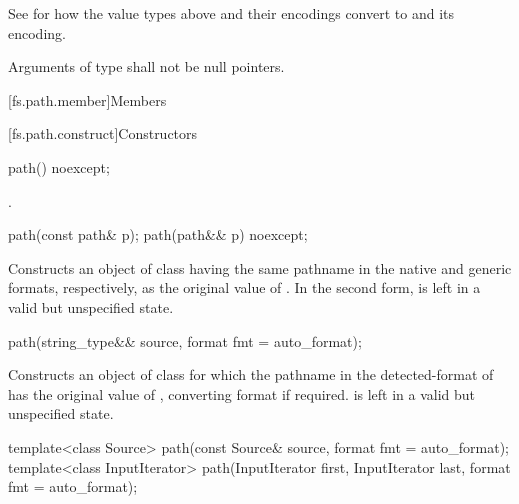 \pnum
\begin{note}
See 
for how the value types above and their encodings convert to
 and its encoding.
\end{note}

\pnum
Arguments of type 
shall not be null pointers.

[fs.path.member]{Members}

[fs.path.construct]{Constructors}

%
\begin{itemdecl}
path() noexcept;
\end{itemdecl}

\begin{itemdescr}
\pnum
\ensures
{}.
\end{itemdescr}

%
\begin{itemdecl}
path(const path& p);
path(path&& p) noexcept;
\end{itemdecl}

\begin{itemdescr}
\pnum
\effects
Constructs an object of class 
having the same pathname in the native and generic formats, respectively,
as the original value of .
In the second form,  is left in a valid but unspecified state.
\end{itemdescr}

%
\begin{itemdecl}
path(string_type&& source, format fmt = auto_format);
\end{itemdecl}

\begin{itemdescr}
\pnum
\effects
Constructs an object of class 
for which the pathname in the detected-format of 
has the original value of ,
converting format if required.
 is left in a valid but unspecified state.
\end{itemdescr}

%
\begin{itemdecl}
template<class Source>
  path(const Source& source, format fmt = auto_format);
template<class InputIterator>
  path(InputIterator first, InputIterator last, format fmt = auto_format);
\end{itemdecl}

